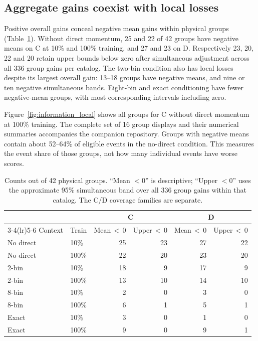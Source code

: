\documentclass[twocolumn,epjc3]{svjour3}
\begin{document}
\subsection{Aggregate gains coexist with local losses}
\label{sec:fresh_local}

Positive overall gains conceal negative mean gains within physical groups
(Table~\ref{tab:information_local}). Without direct momentum, 25 and 22 of
42 groups have negative means on C at 10\% and 100\% training, and 27 and
23 on D. Respectively 23, 20, 22 and 20 retain upper bounds below zero after
simultaneous adjustment across all 336 group gains per catalog.
The two-bin condition also has local losses despite its largest overall gain:
13--18 groups have negative means, and nine or ten negative simultaneous bands.
Eight-bin and exact conditioning have fewer negative-mean groups, with most
corresponding intervals including zero.

Figure~\ref{fig:information_local} shows all groups for C without direct
momentum at 100\% training. The complete set of 16 group displays and
their numerical summaries accompanies the companion repository. Groups with
negative means contain about 52--64\% of eligible events in the no-direct
condition. This measures the event share of those groups, not how many
individual events have worse scores.

\begin{table}[t]
\centering
\setlength{\tabcolsep}{2.1pt}
\caption{Counts out of 42 physical groups. ``Mean $<0$'' is descriptive;
``Upper $<0$'' uses the approximate 95\% simultaneous band over all 336 group
gains within that catalog. The C/D coverage families are separate.}
\label{tab:information_local}
\begin{tabular}{llrrrr}
\toprule
 & & \multicolumn{2}{c}{C} & \multicolumn{2}{c}{D} \\
\cmidrule(lr){3-4}\cmidrule(lr){5-6}
Context & Train & Mean\,${<}\,0$ & Upper\,${<}\,0$ & Mean\,${<}\,0$ & Upper\,${<}\,0$ \\
\midrule
No direct & 10\% & 25 & 23 & 27 & 22 \\
No direct & 100\% & 22 & 20 & 23 & 20 \\
2-bin & 10\% & 18 & 9 & 17 & 9 \\
2-bin & 100\% & 13 & 10 & 14 & 10 \\
8-bin & 10\% & 2 & 0 & 3 & 0 \\
8-bin & 100\% & 6 & 1 & 5 & 1 \\
Exact & 10\% & 3 & 0 & 1 & 0 \\
Exact & 100\% & 9 & 0 & 9 & 1 \\
\bottomrule
\end{tabular}
\end{table}
\end{document}
